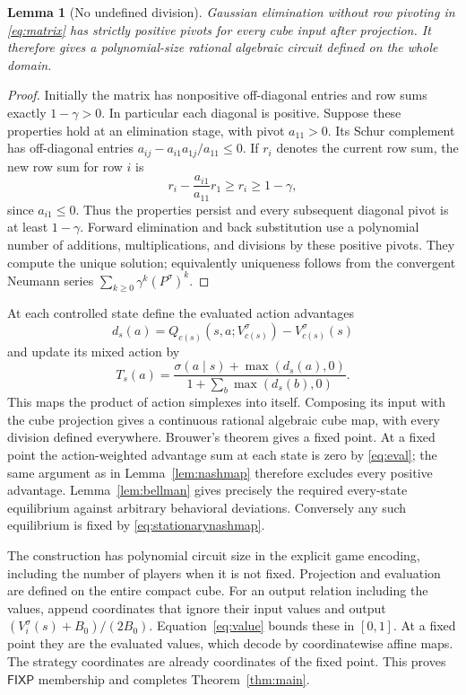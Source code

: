 \documentclass[11pt,a4paper]{article}
\numberwithin{equation}{section}
\newtheorem{lemma}[theorem]{Lemma}
\theoremstyle{definition}
\newcommand{\FIXP}{\mathsf{FIXP}}
\begin{document}
\begin{lemma}[No undefined division]\label{lem:pivots}
Gaussian elimination without row pivoting in \eqref{eq:matrix} has
strictly positive pivots for every cube input after projection.
It therefore gives a polynomial-size rational algebraic circuit
defined on the whole domain.
\end{lemma}
\begin{proof}
Initially the matrix has nonpositive off-diagonal entries and row
sums exactly \(1-\gamma>0\). In particular each diagonal is positive.
Suppose these properties hold at an elimination stage, with pivot
\(a_{11}>0\). Its Schur complement has off-diagonal entries
\(a_{ij}-a_{i1}a_{1j}/a_{11}\leq0\).
If \(r_i\) denotes the current row sum, the new row sum for row \(i\)
is
\[
 r_i-\frac{a_{i1}}{a_{11}}r_1\geq r_i\geq1-\gamma,
\]
since \(a_{i1}\leq0\). Thus the properties persist and every subsequent
diagonal pivot is at least \(1-\gamma\). Forward elimination and back
substitution use a polynomial number of additions, multiplications,
and divisions by these positive pivots. They compute the unique
solution; equivalently uniqueness follows from the convergent Neumann
series \(\sum_{k\geq0}\gamma^k(P^\sigma)^k\).
\end{proof}

At each controlled state define the evaluated action advantages
\[
 d_s(a)=Q_{c(s)}(s,a;V_{c(s)}^\sigma)-V_{c(s)}^\sigma(s)
\]
and update its mixed action by
\begin{equation}\label{eq:stationarynashmap}
 T_s(a)=\frac{\sigma(a\mid s)+\max(d_s(a),0)}
                  {1+\sum_b\max(d_s(b),0)}.
\end{equation}
This maps the product of action simplexes into itself. Composing its
input with the cube projection gives a continuous rational algebraic
cube map, with every division defined everywhere. Brouwer's theorem
gives a fixed point. At a fixed point the action-weighted advantage
sum at each state is zero by \eqref{eq:eval}; the same argument as in
Lemma~\ref{lem:nashmap} therefore excludes every positive advantage.
Lemma~\ref{lem:bellman} gives precisely the required every-state
equilibrium against arbitrary behavioral deviations. Conversely any
such equilibrium is fixed by \eqref{eq:stationarynashmap}.

The construction has polynomial circuit size in the explicit game
encoding, including the number of players when it is not fixed.
Projection and evaluation are defined on the entire compact cube.
For an output relation including the values, append coordinates that
ignore their input values and output
\((V_i^\sigma(s)+B_0)/(2B_0)\). Equation~\eqref{eq:value} bounds
these in \([0,1]\). At a fixed point they are the evaluated values,
which decode by coordinatewise affine maps. The strategy coordinates
are already coordinates of the fixed point. This proves \(\FIXP\)
membership and completes Theorem~\ref{thm:main}.
\end{document}

